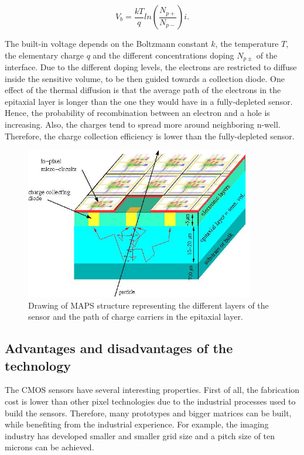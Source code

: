     \begin{equation}
      V_b = \frac{kT}{q}ln\left( \frac{N_{p+}}{N_{p-}}\right)i.
    \end{equation}
    
    The built-in voltage depends on the Boltzmann constant $k$, the temperature $T$, the elementary charge $q$ and the different concentrations doping $N_{p\pm}$ of the interface.
    Due to the different doping levels, the electrons are restricted to diffuse inside the sensitive volume, to be then guided towards a collection diode.
    One effect of the thermal diffusion is that the average path of the electrons in the epitaxial layer is longer than the one they would have in a fully-depleted sensor.
    Hence, the probability of recombination between an electron and a hole is increasing.
    Also, the charges tend to spread more around neighboring n-well.
    Therefore, the charge collection efficiency is lower than the fully-depleted sensor.

    \begin{figure}[!h]
      \centering
      \includegraphics[width = 10cm]{Pictures/vxd/principeMapsMIP.jpg}
      \caption{Drawing of MAPS structure representing the different layers of the sensor and the path of charge carriers in the epitaxial layer.}
      \label{fig:principleMaps}
    \end{figure}

    \subsection{Advantages and disadvantages of the technology}

    The \gls{CMOS} sensors have several interesting properties.
    First of all, the fabrication cost is lower than other pixel technologies due to the industrial processes used to build the sensors.
    Therefore, many prototypes and bigger matrices can be built, while benefiting from the industrial experience.
    For example, the imaging industry has developed smaller and smaller grid size and a pitch size of ten microns can be achieved.
    
